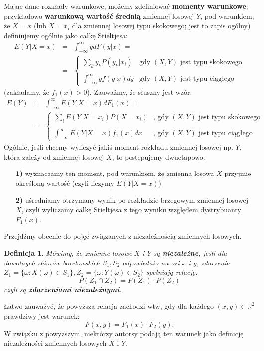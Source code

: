 \documentclass[10pt,a4paper]{article}
\newtheorem{defin}{Definicja}[section]
\begin{document}
Mając dane rozkłady warunkowe, możemy zdefiniować \textbf{momenty warunkowe}; przykładowo \textbf{warunkową wartość średnią} zmiennej losowej $Y$, pod warunkiem, że $X=x$
 (lub $X=x_i$ dla zmiennej losowej typu skokowego; jest to zapis ogólny) definiujemy ogólnie jako całkę Stieltjesa:
\begin{eqnarray}
E(Y|X=x) & = & \int_{-\infty}^{\infty}ydF(y|x) = \\
\nonumber
& = & \left\{ \begin{array}{ll}
\sum_ky_kP(y_k|x_i) & \textrm{gdy $(X,Y)$ jest typu skokowego}\\ \\
\int_{-\infty}^{\infty}yf(y|x)dy & \textrm{gdy $(X,Y)$ jest typu ciągłego}
\end{array} \right.
\end{eqnarray}
(zakładamy, że $f_1(x)>0$). Zauważmy, że słuszny jest wzór:
\begin{eqnarray}
E(Y) & = & \int_{-\infty}^{\infty}E(Y|X=x)dF_1(x) = \\
\nonumber
& = & \left\{ \begin{array}{ll}
\sum_iE(Y|X=x_i)P(X=x_i) & \textrm{, gdy $(X,Y)$ jest typu skokowego}\\ \\
\int_{-\infty}^{\infty}E(Y|X=x)f_1(x)dx & \textrm{, gdy $(X,Y)$ jest typu ciągłego}
\end{array} \right.
\end{eqnarray}
Ogólnie, jeśli chcemy wyliczyć jakiś moment rozkładu zmiennej losowej np. $Y$, która zależy od zmiennej losowej $X$, to postępujemy dwuetapowo: 
\begin{enumerate}
 \item[\textbf{1)}] wyznaczamy ten moment, pod warunkiem, że zmienna losowa $X$ przyjmie określoną wartość (czyli liczymy $E(Y|X=x)$)
\item[\textbf{2)}] uśredniamy otrzymany wynik po rozkładzie brzegowym zmiennej losowej $X$, czyli wyliczamy całkę Stieltjesa z tego wyniku względem dystrybuanty $F_1(x)$.
\end{enumerate}
Przejdźmy obecnie do pojęć związanych z niezależnością zmiennych losowych.
\begin{defin}
Mówimy, że zmienne losowe $X$ i $Y$ są \textbf{niezależne}, jeśli dla dowolnych zbiorów borelowskich $S_1,S_2$ odpowiednio na osi $x$ i $y$, zdarzenia \\
$Z_1=\{\omega:X(\omega)\in S_1\}, Z_2=\{\omega:Y(\omega)\in S_2\}$ spełniają relację:
\begin{equation}
P(Z_1\cap Z_2) = P(Z_1)\cdot P(Z_2)
\end{equation}
czyli są \textbf{zdarzeniami niezależnymi}.
\end{defin}
Łatwo zauważyć, że powyższa relacja zachodzi wtw, gdy dla każdego $(x,y)\in\mathbb{R}^2$ prawdziwy jest warunek:
\[F(x,y)=F_1(x)\cdot F_2(y).\]
W związku z powyższym, niektórzy autorzy podają ten warunek jako definicję niezależności zmiennych losowych $X$ i $Y$.
\end{document}

